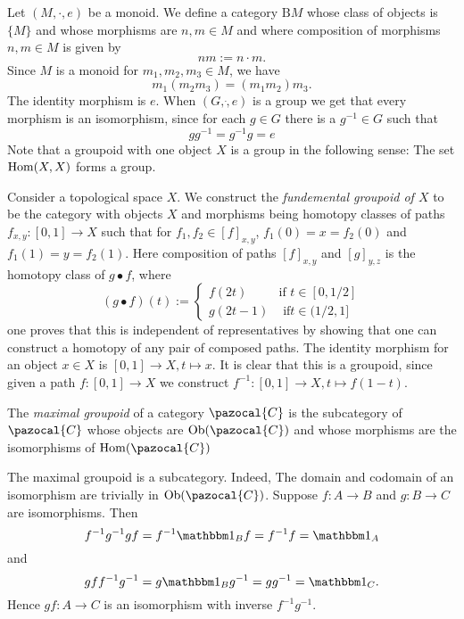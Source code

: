 \begin{example}\label{MonoidIsACategoryGroupIsGroupoid}
    Let $(M,\cdot,e)$ be a monoid. We define a category $\mathrm{B}M$ whose class of objects is $\{M\}$ and whose morphisms are $n,m\in M$ and where composition of morphisms $n,m\in M$ is given by 
    $$nm := n\cdot m.$$  
    Since $M$ is a monoid for $m_1,m_2,m_3\in M$, we have 
    $$m_1(m_2m_3)=(m_1m_2)m_3.$$
    The identity morphism is $e$. When $(G,\dot,e)$ is a group we get that every morphism is an isomorphism, since for each $g\in G$ there is a $g^{-1}\in G$ such that 
    $$gg^{-1}=g^{-1}g = e$$ 
    Note that a groupoid with one object $X$ is a group in the following sense: The set $\mathrm{Hom}(X,X)$ forms a group.
\end{example}
\begin{example}
    Consider a topological space $X$. We construct the \emph{fundemental groupoid of $X$} to be the category with objects $X$ and morphisms being homotopy classes of paths $f_{x,y}:[0,1]\rightarrow X$ such that for $f_1,f_2\in [f]_{x,y}$, $f_1(0)=x=f_2(0)$ and  $f_1(1)=y=f_2(1)$. Here composition of paths $[f]_{x,y}$ and $[g]_{y,z}$ is the homotopy class of $g\bullet f$, where 
    $$
        (g\bullet f)(t) := 
        \begin{cases}
            f(2t) & \text{if } t\in [0,1/2]\\
            g(2t-1) & \text{ if} t\in (1/2,1]
        \end{cases}
    $$
    one proves that this is independent of representatives by showing that one can construct a homotopy of any pair of composed paths. The identity morphism for an object $x\in X$ is $[0,1]\rightarrow X, t\mapsto x$. It is clear that this is a groupoid, since given a path $f:[0,1]\rightarrow X$ we construct $f^{-1}:[0,1]\rightarrow X, t\mapsto f(1-t)$.
\end{example}
\begin{definition}
    The \textit{maximal groupoid} of a category $\pazocal{C}$ is the subcategory of $\pazocal{C}$ whose objects are $\Ob(\pazocal{C})$ and whose morphisms are the isomorphisms of $\Hom(\pazocal{C})$
\end{definition}
\begin{remark}
    The maximal groupoid is a subcategory. Indeed, The domain and codomain of an isomorphism are trivially in $\Ob(\pazocal{C})$. Suppose $f:A\rightarrow B$ and $g: B \rightarrow C$ are isomorphisms. Then 
    $$f^{-1}g^{-1}gf=f^{-1}\fone_B f = f^{-1}f = \fone_A$$
    and 
    $$gff^{-1}g^{-1} = g\fone_B g^{-1} = gg^{-1} = \fone_C.$$
    Hence $gf: A \rightarrow C$ is an isomorphism with inverse $f^{-1}g^{-1}$. 
\end{remark}

